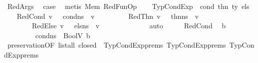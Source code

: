 \begin{isabellebody}
\ RedArgs\ \isamarkupfalse%
\ {\isacharquery}{\kern0pt}case\ \isamarkupfalse%
\ {\isacharparenleft}{\kern0pt}metis\ Mem\ RedFunOp{\isacharparenright}{\kern0pt}\isanewline
{}\isamarkupfalse%
\isanewline
\ \ \isamarkupfalse%
\ {\isacharparenleft}{\kern0pt}TypCondExp\ {\isasymDelta}\ cond\ thn\ ty\ els{\isacharparenright}{\kern0pt}\isanewline
\ \ \isamarkupfalse%
\ RedCond{\isacharcolon}{\kern0pt}\ {\isachardoublequoteopen}{\isasymexists}v{\isachardot}{\kern0pt}\ {\isasymLambda}{\isacharcomma}{\kern0pt}{\isasymGamma}{\isacharcomma}{\kern0pt}{\isasymOmega}\ {\isasymturnstile}\ {\isasymlangle}cond{\isacharcomma}{\kern0pt}n{\isacharunderscore}{\kern0pt}s{\isasymrangle}\ {\isasymDown}\ v{\isachardoublequoteclose}\ \isanewline
\ \ \ \ \ \ \ \ RedThn{\isacharcolon}{\kern0pt}\ {\isachardoublequoteopen}{\isasymexists}v{\isachardot}{\kern0pt}\ {\isasymLambda}{\isacharcomma}{\kern0pt}{\isasymGamma}{\isacharcomma}{\kern0pt}{\isasymOmega}\ {\isasymturnstile}\ {\isasymlangle}thn{\isacharcomma}{\kern0pt}n{\isacharunderscore}{\kern0pt}s{\isasymrangle}\ {\isasymDown}\ v{\isachardoublequoteclose}\ \isanewline
\ \ \ \ \ \ \ \ RedElse{\isacharcolon}{\kern0pt}\ {\isachardoublequoteopen}{\isasymexists}v{\isachardot}{\kern0pt}\ {\isasymLambda}{\isacharcomma}{\kern0pt}{\isasymGamma}{\isacharcomma}{\kern0pt}{\isasymOmega}\ {\isasymturnstile}\ {\isasymlangle}els{\isacharcomma}{\kern0pt}n{\isacharunderscore}{\kern0pt}s{\isasymrangle}\ {\isasymDown}\ v{\isachardoublequoteclose}\ \ \ \ \ \ \ \ \isanewline
\ \ \ \ \isamarkupfalse%
\ auto\isanewline
\isanewline
\ \ \isamarkupfalse%
\ \isamarkupfalse%
\ RedCond\ \isamarkupfalse%
\ b\ \isanewline
\ \ \ \ \ \ \ {\isachardoublequoteopen}{\isasymLambda}{\isacharcomma}{\kern0pt}{\isasymGamma}{\isacharcomma}{\kern0pt}{\isasymOmega}\ {\isasymturnstile}\ {\isasymlangle}cond{\isacharcomma}{\kern0pt}n{\isacharunderscore}{\kern0pt}s{\isasymrangle}\ {\isasymDown}\ BoolV\ b{\isachardoublequoteclose}\isanewline
\ \ \ \ \isamarkupfalse%
\ preservation{\isacharparenleft}{\kern0pt}{}{\isacharparenright}{\kern0pt}{\isacharbrackleft}{\kern0pt}OF\ {\isacartoucheopen}list{\isacharunderscore}{\kern0pt}all\ closed\ {\isasymOmega}{\isacartoucheclose}\ TypCondExp{\isachardot}{\kern0pt}prems{\isacharparenleft}{\kern0pt}{}{\isacharparenright}{\kern0pt}\ TypCondExp{\isachardot}{\kern0pt}prems{\isacharparenleft}{\kern0pt}{}{\isacharparenright}{\kern0pt}\ TypCondExp{\isachardot}{\kern0pt}prems{\isacharparenleft}{\kern0pt}{}{\isacharparenright}{\kern0pt}\ \isanewline

\end{isabellebody}
